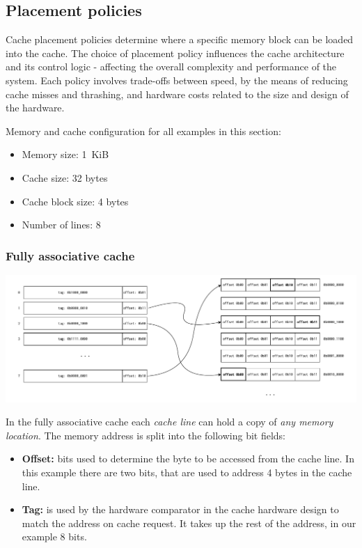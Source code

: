 %
\subsection{Placement policies} \label{sec:placement}
Cache placement policies determine where a specific memory block can be loaded into
the cache. The choice of placement policy influences the cache architecture and
its control logic - affecting the overall complexity and performance of the system.
Each policy involves trade-offs between speed, by the means of reducing cache misses and
thrashing, and hardware costs related to the size and design of the hardware.

\vspace{10px}
\noindent Memory and cache configuration for all examples in this section:
\begin{itemize}
	\item Memory size: 1 KiB
	\item Cache size: 32 bytes
	\item Cache block size: 4 bytes
	\item Number of lines: 8
\end{itemize}

\subsubsection{Fully associative cache}
\begin{center}
	\centering
	\includegraphics[width=\textwidth]{figures/02-background/full_ass_mem.pdf}
	\label{fig:full_ass_mem}
\end{center}

\noindent In the fully associative cache each \textit{cache line} can hold a copy of \textit{any memory location}. The memory address is split into the following bit fields:

\begin{itemize}
	\item \textbf{Offset:} bits used to determine the byte to be accessed from the cache line. In this example there are two bits, that are used to address 4 bytes in the cache line.
	\item \textbf{Tag:} is used by the hardware comparator in the cache hardware design to match the address on cache request. It takes up the rest of the address, in our example 8 bits.
\end{itemize}



